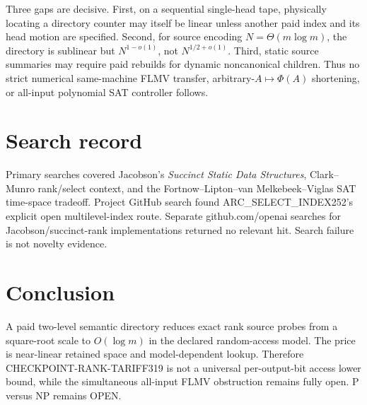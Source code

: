 \documentclass[11pt]{article}
\begin{document}
Three gaps are decisive. First, on a sequential single-head tape, physically
locating a directory counter may itself be linear unless another paid index
and its head motion are specified. Second, for source encoding
$N=\Theta(m\log m)$, the directory is sublinear but
$N^{1-o(1)}$, not $N^{1/2+o(1)}$. Third, static source summaries may require
paid rebuilds for dynamic noncanonical children. Thus no strict numerical
same-machine FLMV transfer, arbitrary-$A\mapsto\Phi(A)$ shortening, or
all-input polynomial SAT controller follows.

\section{Search record}
Primary searches covered Jacobson's \emph{Succinct Static Data Structures},
Clark--Munro rank/select context, and the Fortnow--Lipton--van Melkebeek--Viglas
SAT time-space tradeoff. Project GitHub search found ARC\_SELECT\_INDEX252's
explicit open multilevel-index route. Separate github.com/openai searches for
Jacobson/succinct-rank implementations returned no relevant hit. Search
failure is not novelty evidence.

\section{Conclusion}
A paid two-level semantic directory reduces exact rank source probes from a
square-root scale to $O(\log m)$ in the declared random-access model. The price
is near-linear retained space and model-dependent lookup. Therefore
CHECKPOINT-RANK-TARIFF319 is not a universal per-output-bit access lower bound,
while the simultaneous all-input FLMV obstruction remains fully open. P
versus NP remains OPEN.
\end{document}
